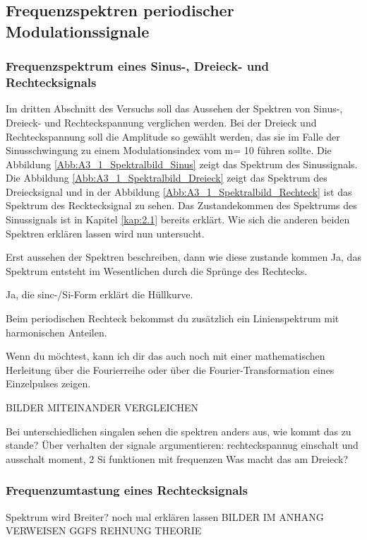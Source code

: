 \documentclass[12pt]{scrartcl}
\begin{document}
\subsection{Frequenzspektren periodischer Modulationssignale}
\subsubsection{Frequenzspektrum eines Sinus-, Dreieck- und Rechtecksignals}
Im dritten Abschnitt des Versuchs soll das Aussehen der Spektren von Sinus-, Dreieck- und Rechteckspannung verglichen werden. 
Bei der Dreieck und Rechteckspannung soll die Amplitude so gewählt werden, das sie im Falle der Sinusschwingung zu einem Modulationsindex vom m= 10 führen sollte.
Die Abbildung \ref{Abb:A3_1_Spektralbild_Sinus} zeigt das Spektrum des Sinussignals. Die Abbildung \ref{Abb:A3_1_Spektralbild_Dreieck} zeigt das Spektrum des Dreiecksignal und in der Abbildung \ref{Abb:A3_1_Spektralbild_Rechteck} ist das Spektrum des Recktecksignal zu sehen.
Das Zustandekommen des Spektrums des Sinussignals ist in Kapitel \ref{kap:2.1} bereits erklärt. 
Wie sich die anderen beiden Spektren erklären lassen wird nun untersucht. 


Erst aussehen der Spektren beschreiben, dann wie diese zustande kommen 
Ja, das Spektrum entsteht im Wesentlichen durch die Sprünge des Rechtecks.

Ja, die sinc-/Si-Form erklärt die Hüllkurve.

Beim periodischen Rechteck bekommst du zusätzlich ein Linienspektrum mit harmonischen Anteilen.

Wenn du möchtest, kann ich dir das auch noch mit einer mathematischen Herleitung über die Fourierreihe oder über die Fourier-Transformation eines Einzelpulses zeigen.

BILDER MITEINANDER VERGLEICHEN 

Bei unterschiedlichen singalen sehen die spektren anders aus, wie kommt das zu stande? 
Über verhalten der signale argumentieren: rechteckspannug einschalt und ausschalt moment, 2 Si funktionen mit frequenzen 
Was macht das am Dreieck?



\subsubsection{Frequenzumtastung eines Rechtecksignals}
Spektrum wird Breiter? 
noch mal erklären lassen 
BILDER IM ANHANG VERWEISEN 
GGFS REHNUNG THEORIE
\end{document}
